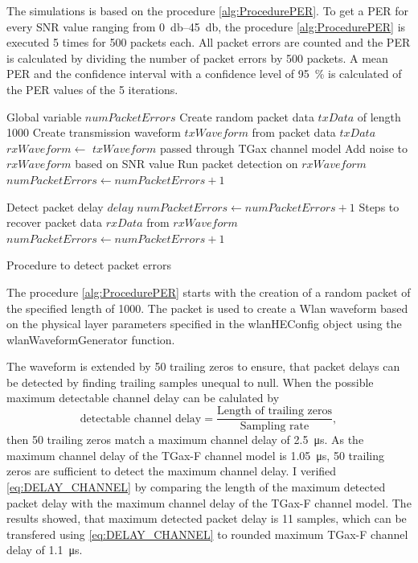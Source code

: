 The simulations is based on the procedure \autoref{alg:ProcedurePER}. To get a \ac{PER} for every \ac{SNR} value ranging
from \SIrange{0}{45}{\decibel}, the procedure \autoref{alg:ProcedurePER} is executed \num{5} times for \num{500} packets each.
All packet errors are counted and the \ac{PER} is calculated by dividing the number of packet errors by \num{500} packets.
A mean \ac{PER} and the confidence interval with a confidence level of
\SI{95}{\percent} is calculated of the \ac{PER} values of the \num{5} iterations.
\begin{algorithm}
\begin{algorithmic}[1]
\REQUIRE Global variable $numPacketErrors$
\STATE Create random packet data $txData$ of length \SI{1000}{\byte}
\STATE Create transmission waveform $txWaveform$ from packet data $txData$
\STATE $rxWaveform \gets $ $txWaveform$ passed through TGax channel model
\STATE Add noise to $rxWaveform$ based on \ac{SNR} value
\STATE Run packet detection on $rxWaveform$
    \STATE $numPacketErrors \gets numPacketErrors + 1$
\ENDIF

\STATE Detect packet delay $delay$
    \STATE $numPacketErrors \gets numPacketErrors + 1$
\ENDIF
\STATE Steps to recover packet data $rxData$ from $rxWaveform$
    \STATE $numPacketErrors \gets numPacketErrors + 1$
\ENDIF
\end{algorithmic}
\caption{Procedure to detect packet errors}
\label{alg:ProcedurePER}
\end{algorithm}

The procedure \autoref{alg:ProcedurePER} starts with the creation of a random packet of the specified length of \SI{1000}{\byte}.
The packet is used to create a Wlan waveform based on the physical layer parameters specified in the wlanHEConfig object using the wlanWaveformGenerator function.

The waveform is extended by
\num{50} trailing zeros to ensure, that packet delays can be detected by finding trailing samples unequal to null. When the possible maximum detectable channel delay can be calulated by
\begin{equation}\label{eq:DELAY_CHANNEL}
	\text{detectable channel delay} =
	\frac{
		\text{Length of trailing zeros}
	}{
		\text{Sampling rate}
	}
	,
\end{equation}
then \num{50} trailing zeros match a maximum channel delay of \SI{2.5}{\micro\second}. As the maximum channel delay of the TGax-F channel model is \SI{1.05}{\micro\second},
\num{50} trailing zeros are sufficient to detect the maximum channel delay. I verified \autoref{eq:DELAY_CHANNEL} by comparing
the length of the maximum detected packet delay with the maximum channel delay of the TGax-F channel model. The results showed,
that maximum detected packet delay is \num{11} samples, which can be transfered using \autoref{eq:DELAY_CHANNEL} to rounded maximum TGax-F channel delay of \SI{1.1}{\micro\second}.

